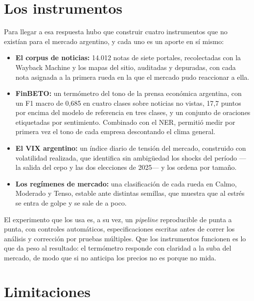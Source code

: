 \section{Los instrumentos}

Para llegar a esa respuesta hubo que construir cuatro instrumentos que no existían para el
mercado argentino, y cada uno es un aporte en sí mismo:

\begin{itemize}
  \item \textbf{El corpus de noticias:} 14.012 notas de siete portales, recolectadas con la
        Wayback Machine y los mapas del sitio, auditadas y depuradas, con cada nota asignada a
        la primera rueda en la que el mercado pudo reaccionar a ella.
  \item \textbf{FinBETO:} un termómetro del tono de la prensa económica argentina, con un F1
        macro de 0,685 en cuatro clases sobre noticias no vistas, 17,7 puntos por encima del
        modelo de referencia en tres clases, y un conjunto de oraciones etiquetadas por
        sentimiento. Combinado con el NER, permitió medir por primera vez el tono de cada
        empresa descontando el clima general.
  \item \textbf{El VIX argentino:} un índice diario de tensión del mercado, construido con
        volatilidad realizada, que identifica sin ambigüedad los shocks del período —la salida
        del cepo y las dos elecciones de 2025— y los ordena por tamaño.
  \item \textbf{Los regímenes de mercado:} una clasificación de cada rueda en Calmo, Moderado y
        Tenso, estable ante distintas semillas, que muestra que al estrés se entra de golpe y
        se sale de a poco.
\end{itemize}

El experimento que los usa es, a su vez, un \textit{pipeline} reproducible de punta a punta,
con controles automáticos, especificaciones escritas antes de correr los análisis y corrección
por pruebas múltiples. Que los instrumentos funcionen es lo que da peso al resultado: el
termómetro responde con claridad a la suba del mercado, de modo que si no anticipa los precios
no es porque no mida.

\section{Limitaciones}

